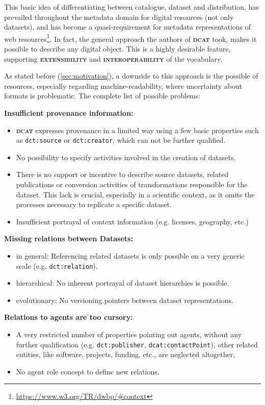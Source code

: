 \documentclass[a4paper,english,twoside,BCOR1.5cm,headsepline,DIV12,appendixprefix,final,12pt]{scrbook}
\newcommand{\extensibility}{{\ttfamily\scshape\bfseries extensibility}\xspace}
\newcommand{\interoperability}{{\ttfamily\scshape\bfseries interoperability}\xspace}
\newcommand{\dcat}{{\scshape\bfseries dcat}\xspace}
\newcommand{\prop}[1]{{{\texttt{#1}}}}
\newcommand\footnoteurl[1]{\footnote{\scriptsize\url{#1}}}
\begin{document}
This basic idea of differentiating between catalogue, dataset and distribution, has prevailed throughout the metadata domain for digital resources (not only datasets), and has become a quasi-requirement for metadata representations of web resources\footnoteurl{https://www.w3.org/TR/dwbp/#context}. In fact, the general approach the authors of \dcat took, makes it possible to describe any digital object. This is a highly desirable feature, supporting \extensibility and \interoperability of the vocabulary.

As stated before (\cref{sec:motivation}), a downside to this approach is the possible   of resources, especially regarding machine-readability, where uncertainty about formats is problematic. The complete list of possible problems:

\textbf{Insufficient provenance information:}
\begin{itemize}
\item \dcat expresses provenance in a limited way using a few basic properties such as
\prop{dct:source} or \prop{dct:creator}, which can not be further qualified.
\item No possibility to specify activities involved in the creation of datasets.
\item There is no support or incentive to describe source datasets, related publications or conversion activities of transformations responsible for the dataset. This lack is crucial, especially in a scientific context, as it omits the processes necessary to replicate a specific dataset.
\item Insufficient portrayal of context information (e.g. licenses, geography, etc.)
\end{itemize}

\textbf{Missing relations between Datasets:}
\begin{itemize}
\item in general: Referencing related datasets is only possible on a very generic scale (e.g. \prop{dct:relation}).
\item hierarchical: No inherent portrayal of dataset hierarchies is possible.
\item evolutionary: No versioning pointers between dataset representations.
\end{itemize}

\textbf{Relations to agents are too cursory:}
\begin{itemize}
\item A very restricted number of properties pointing out agents, without any further qualification (e.g. \prop{dct:publisher}, \prop{dcat:contactPoint}), other related entities, like software, projects, funding, etc., are neglected altogether.
\item No agent role concept to define new relations.
\end{itemize}
\end{document}
